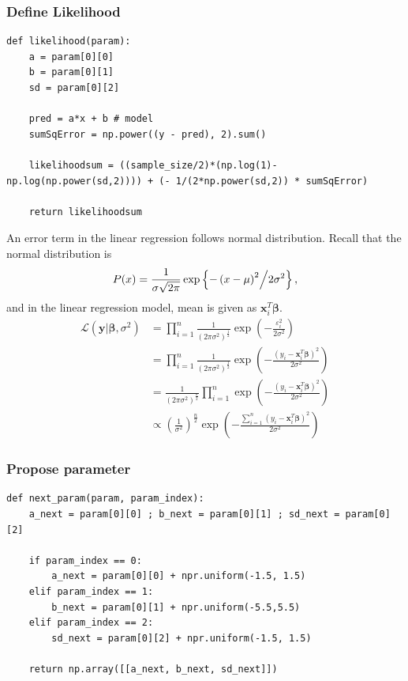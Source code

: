 \documentclass[a4paper,10.5pt,uplatex]{jsarticle}  %
\begin{document}
\subsubsection{Define Likelihood}
\begin{lstlisting}
def likelihood(param):
    a = param[0][0]
    b = param[0][1]
    sd = param[0][2]
    
    pred = a*x + b # model
    sumSqError = np.power((y - pred), 2).sum()
    
    likelihoodsum = ((sample_size/2)*(np.log(1)-np.log(np.power(sd,2)))) + (- 1/(2*np.power(sd,2)) * sumSqError)
    
    return likelihoodsum
\end{lstlisting}
An error term in the linear regression follows normal distribution. Recall that the normal distribution is $$P(x) = \frac{1}{{\sigma \sqrt {2\pi } }} \exp\left\{  {{{ - \left( {x - \mu } \right)^2 } \mathord{\left/ {\vphantom {{ - \left( {x - \mu } \right)^2 } {2\sigma ^2 }}} \right. \kern-\nulldelimiterspace} {2\sigma ^2 }}}  \right\},$$ and in the linear regression model, mean is given as $\mathbf{x}_i^T \boldsymbol{\beta}$. 
\begin{align}
  \mathcal{L}(\mathbf{y}|\boldsymbol{\beta}, \sigma^2) &= \prod_{i=1}^{n} \frac{1}{(2 \pi \sigma^2)^{\frac{1}{2}}} \exp \left( - \frac{\varepsilon_i^2}{2 \sigma^2}  \right) \\[10pt]
                                                       &= \prod_{i=1}^{n} \frac{1}{(2 \pi \sigma^2)^{\frac{1}{2}}} \exp \left( - \frac{(y_i - \mathbf{x}_i^T \boldsymbol{\beta})^2}{2 \sigma^2}  \right) \\[10pt]
 &= \frac{1}{(2 \pi \sigma^2)^{\frac{n}{2}}} \prod_{i=1}^{n}  \exp \left( - \frac{(y_i - \mathbf{x}_i^T \boldsymbol{\beta})^2}{2 \sigma^2}  \right) \\[10pt]
                                                       &\propto \left( \frac{1}{\sigma^2} \right)^{\frac{n}{2}} \exp \left( - \frac{\sum_{i=1}^{n} (y_i - \mathbf{x}_i^T \boldsymbol{\beta})^2 }{2 \sigma^2} \right)
\end{align}

\subsubsection{Propose parameter}
\begin{lstlisting}[caption={Draw a parameter one by one}]
def next_param(param, param_index):
    a_next = param[0][0] ; b_next = param[0][1] ; sd_next = param[0][2]
    
    if param_index == 0:
        a_next = param[0][0] + npr.uniform(-1.5, 1.5)
    elif param_index == 1:
        b_next = param[0][1] + npr.uniform(-5.5,5.5)
    elif param_index == 2:
        sd_next = param[0][2] + npr.uniform(-1.5, 1.5)
        
    return np.array([[a_next, b_next, sd_next]])
\end{lstlisting}
\end{document}

